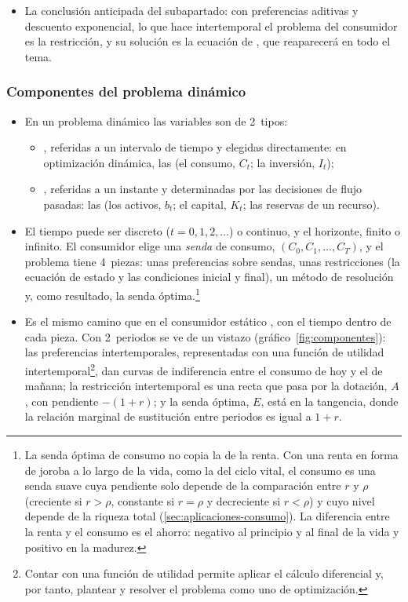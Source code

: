 \documentclass[11pt]{article}
\begin{document}
\begin{itemize}
\item La conclusión anticipada del subapartado: con preferencias aditivas y descuento exponencial, lo que hace intertemporal el problema del consumidor es la restricción, y su solución es la ecuación de , que reaparecerá en todo el tema.
\end{itemize}

\subsubsection{Componentes del problema dinámico}\label{sec:componentes}

\begin{itemize}
\item En un problema dinámico las variables son de 2~tipos:
  \begin{itemize}
  \item {}, referidas a un intervalo de tiempo y elegidas directamente: en optimización dinámica, las  (el consumo, $C_t$; la inversión, $I_t$);
  \item {}, referidas a un instante y determinadas por las decisiones de flujo pasadas: las  (los activos, $b_t$; el capital, $K_t$; las reservas de un recurso).
  \end{itemize}
\item El tiempo puede ser discreto ($t=0,1,2,\dots$) o continuo, y el horizonte, finito o infinito. El consumidor elige una \emph{senda} de consumo, $(C_0,C_1,\dots,C_T)$, y el problema tiene 4~piezas: unas preferencias sobre sendas, unas restricciones (la ecuación de estado y las condiciones inicial y final), un método de resolución y, como resultado, la senda óptima.\footnote{La senda óptima de consumo no copia la de la renta. Con una renta en forma de joroba a lo largo de la vida, como la del ciclo vital, el consumo es una senda suave cuya pendiente solo depende de la comparación entre $r$ y $\rho$ (creciente si $r>\rho$, constante si $r=\rho$ y decreciente si $r<\rho$) y cuyo nivel depende de la riqueza total (\ref{sec:aplicaciones-consumo}). La diferencia entre la renta y el consumo es el ahorro: negativo al principio y al final de la vida y positivo en la madurez.}
\item Es el mismo camino que en el consumidor estático , con el tiempo dentro de cada pieza. Con 2~periodos se ve de un vistazo (gráfico~\ref{fig:componentes}): las preferencias intertemporales, representadas con una función de utilidad intertemporal\footnote{Contar con una función de utilidad permite aplicar el cálculo diferencial y, por tanto, plantear y resolver el problema como uno de optimización.}, dan curvas de indiferencia entre el consumo de hoy y el de mañana; la restricción intertemporal es una recta que pasa por la dotación, $A$, con pendiente $-(1+r)$; y la senda óptima, $E$, está en la tangencia, donde la relación marginal de sustitución entre periodos es igual a $1+r$.

\end{itemize}
\end{document}
